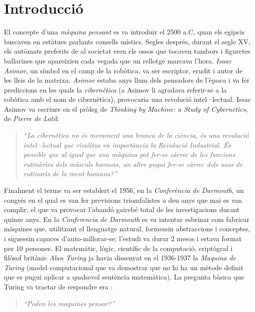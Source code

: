 \section{Introducció}

El concepte d'una \emph{màquina pensant} es va introduir el 2500 a.C, quan els egipcis buscaven en estàtues parlants consells místics. Segles després, durant el segle XV, els autòmats preferits de al societat eren els ossos que tocaven tambors i figuretes ballarines que apareixien cada vegada que un rellotge marcava l'hora. \emph{Isaac Asimov}, un símbol en el camp de la robòtica, va ser escriptor, erudit i autor de les lleis de la mateixa. \emph{Asimov} estaba anys llum dels pensadors de l'època i va fer prediccions en les quals la \emph{cibernètica} (a Asimov li agradava referir-se a la robòtica amb el nom de cibernètica), provocaria una revolució intel·lectual. 
Issac Asimov va escriure en el pròleg de \emph{Thinking by Machine: a Study of Cybernetics}, de \emph{Pierre de Latil}:

\begin{quote}
\emph{``La cibernètica no és merament una branca de la ciència, és una revolució intel·lectual que rivalitza en importància la Revolució Industrial. És possible que al igual que una màquina pot fer-se càrrec de les funcions rutinàries dels músculs humans, un altre pugui fer-se càrrec dels usos de rutinaris de la ment humana?''}

\end{quote}

Finalment el terme va ser establert el 1956, en la \emph{Conferència de Darmouth}, un congrés en el qual es van fer previsions triomfalistes a deu anys que mai es van complir, el que va provocar l'abandó gairebé total de les investigacions durant quinze anys. En la \emph{Conferencia de Darmouth} es va intentar esbrinar com fabricar màquines que, utilitzant el llenguatge natural, formessin abstraccions i conceptes, i siguessin capaces d'auto-millorar-se; l'estudi va durar 2 mesos i estava format per 10 persones. El matemàtic, lògic, científic de la computació, criptògraf  i filòsof britànic \emph{Alan Turing} ja havia dissenyat en el 1936-1937 la \emph{Maquina de Turing} (model computacional que va demostrar que no hi ha un mètode definit que es pugui aplicar a qualsevol sentència matemàtica). La pregunta bàsica que Turing va tractar de respondre era \cite{Matur} \cite{Algor}: 

\begin{quote}
	\emph{``Poden les maquines pensar?''}
\end{quote}

